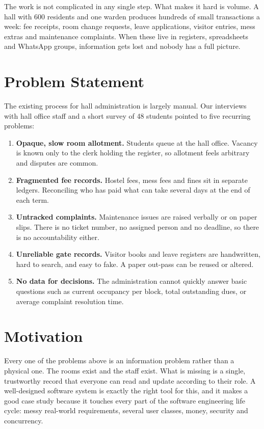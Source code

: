 \documentclass[11pt,a4paper]{report}
\begin{document}
The work is not complicated in any single step. What makes it hard is volume. A hall with 600 residents and one warden produces hundreds of small transactions a week: fee receipts, room change requests, leave applications, visitor entries, mess extras and maintenance complaints. When these live in registers, spreadsheets and WhatsApp groups, information gets lost and nobody has a full picture.

\section{Problem Statement}
The existing process for hall administration is largely manual. Our interviews with hall office staff and a short survey of 48 students pointed to five recurring problems:

\begin{enumerate}
  \item \textbf{Opaque, slow room allotment.} Students queue at the hall office. Vacancy is known only to the clerk holding the register, so allotment feels arbitrary and disputes are common.
  \item \textbf{Fragmented fee records.} Hostel fees, mess fees and fines sit in separate ledgers. Reconciling who has paid what can take several days at the end of each term.
  \item \textbf{Untracked complaints.} Maintenance issues are raised verbally or on paper slips. There is no ticket number, no assigned person and no deadline, so there is no accountability either.
  \item \textbf{Unreliable gate records.} Visitor books and leave registers are handwritten, hard to search, and easy to fake. A paper out-pass can be reused or altered.
  \item \textbf{No data for decisions.} The administration cannot quickly answer basic questions such as current occupancy per block, total outstanding dues, or average complaint resolution time.
\end{enumerate}

\section{Motivation}
Every one of the problems above is an information problem rather than a physical one. The rooms exist and the staff exist. What is missing is a single, trustworthy record that everyone can read and update according to their role. A well-designed software system is exactly the right tool for this, and it makes a good case study because it touches every part of the software engineering life cycle: messy real-world requirements, several user classes, money, security and concurrency.
\end{document}

